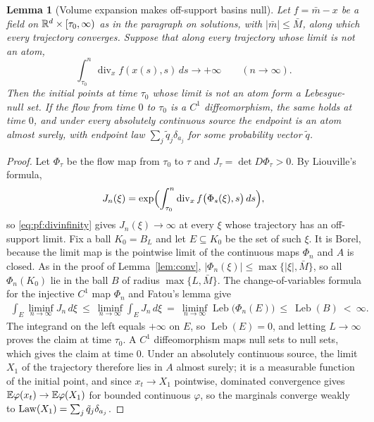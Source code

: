 \documentclass{article} %
\theoremstyle{plain}
\newtheorem{lemma}[theorem]{Lemma}
\theoremstyle{definition}
\theoremstyle{remark}
\begin{document}
\begin{lemma}[Volume expansion makes off-support basins null]
\label{lem:volume}
Let $f=\bar m-x$ be a field on $\mathbb{R}^d\times[\tau_0,\infty)$ as in the paragraph on solutions,
with $|\bar m|\le\bar M$, along which every trajectory converges. Suppose that along every
trajectory whose limit is not an atom,
\begin{equation}
\int_{\tau_0}^n\operatorname{div}_xf(x(s),s)\,ds\longrightarrow+\infty\qquad(n\to\infty).
\label{eq:pf:divinfinity}
\end{equation}
Then the initial points at time $\tau_0$ whose limit is not an atom form a Lebesgue-null set. If
the flow from time $0$ to $\tau_0$ is a $C^1$ diffeomorphism, the same holds at time $0$, and
under every absolutely continuous source the endpoint is an atom almost surely, with endpoint law
$\sum_j\tilde q_j\delta_{a_j}$ for some probability vector $\tilde q$.
\end{lemma}
\begin{proof}
Let $\Phi_\tau$ be the flow map from $\tau_0$ to $\tau$ and $J_\tau=\det D\Phi_\tau>0$. By
Liouville's formula,
\[
J_n(\xi)=\exp\Bigl(\int_{\tau_0}^n\operatorname{div}_xf\bigl(\Phi_s(\xi),s\bigr)\,ds\Bigr),
\]
so \eqref{eq:pf:divinfinity} gives $J_n(\xi)\to\infty$ at every $\xi$ whose trajectory has an
off-support limit. Fix a ball $K_0=B_L$ and let $E\subseteq K_0$ be the set of such $\xi$. It is Borel,
because the limit map is the pointwise limit of the continuous maps $\Phi_n$ and $A$ is closed. As
in the proof of Lemma~\ref{lem:conv}, $|\Phi_n(\xi)|\le\max\{|\xi|,\bar M\}$, so all $\Phi_n(K_0)$
lie in the ball $B$ of radius $\max\{L,\bar M\}$. The change-of-variables formula for the injective
$C^1$ map $\Phi_n$ and Fatou's lemma give
\begin{align*}
\int_E\liminf_{n\to\infty}J_n\,d\xi
\ \le\ \liminf_{n\to\infty}\int_EJ_n\,d\xi
\ =\ \liminf_{n\to\infty}\operatorname{Leb}\bigl(\Phi_n(E)\bigr)
\ \le\ \operatorname{Leb}(B)\ <\ \infty .
\end{align*}
The integrand on the left equals $+\infty$ on $E$, so $\operatorname{Leb}(E)=0$, and letting
$L\to\infty$ proves the claim at time $\tau_0$. A $C^1$ diffeomorphism maps null sets to null
sets, which gives the claim at time $0$. Under an absolutely continuous source, the limit $X_1$ of
the trajectory therefore lies in $A$ almost surely; it is a measurable function of the initial
point, and since $x_t\to X_1$ pointwise, dominated convergence gives
$\mathbb{E}\varphi(x_t)\to\mathbb{E}\varphi(X_1)$ for bounded continuous $\varphi$, so the marginals converge
weakly to $\mathrm{Law}(X_1)=\sum_j\tilde q_j\delta_{a_j}$.
\end{proof}
\end{document}
